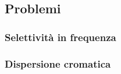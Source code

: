 \subsection{Problemi}

\subsubsection{Selettività in frequenza}

\subsubsection{Dispersione cromatica}
